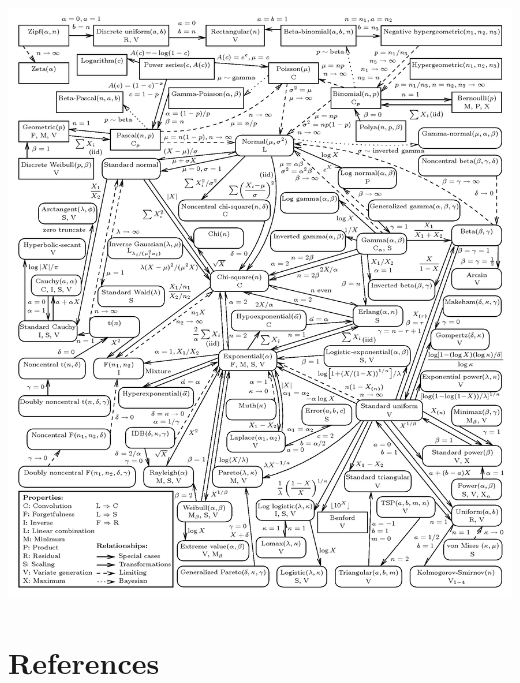 \documentclass[6pt,Portrait]{article}
\begin{document}
\includegraphics[width=1\textwidth,height=\textheight]{UnivariateDistribution.png}

\hypertarget{references}{%
\section{References}\label{references}}
\end{document}
